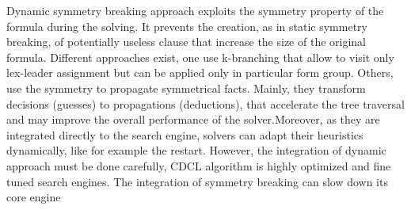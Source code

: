 Dynamic symmetry breaking approach exploits the symmetry property of the formula during the solving.
It prevents the creation, as in static symmetry breaking, of potentially useless clause that increase the size of the original formula.
Different approaches exist, one use k-branching that allow to visit only lex-leader assignment but can be applied only in particular form group.
Others, use the symmetry to propagate symmetrical facts.
Mainly, they transform decisions (guesses) to propagations (deductions), that accelerate the tree traversal and may improve the overall
performance of the solver.Moreover, as they are integrated directly to the search engine, solvers can adapt their heuristics dynamically, like for
example the restart.
However, the integration of dynamic approach must be done carefully, CDCL algorithm is highly optimized and 
fine tuned search engines. The integration of symmetry breaking can slow down its core engine


%




